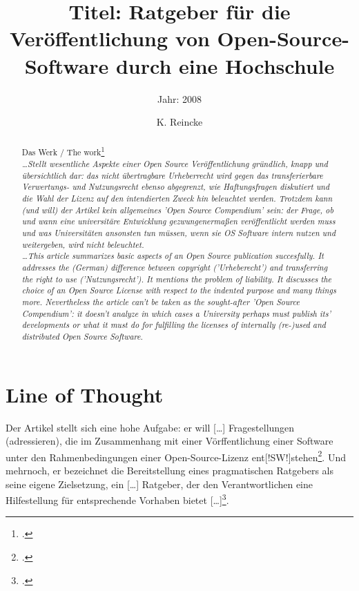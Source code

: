 \documentclass[DIV=calc,BCOR=5mm,11pt,headings=small,oneside,abstract=true, toc=bib]{scrartcl}
\begin{document}

\titlehead{Literaturexzerpt}
\subject{Autor(en): Bretschneider Glaschick Gräfe}
\title{Titel: Ratgeber für die Veröffentlichung von Open-Source-Software durch
eine Hochschule}
\subtitle{Jahr: 2008 }
\author{K. Reincke}

\maketitle

\begin{abstract}
\noindent
Das Werk / The work\footcite[][]{BreGlaGra2008a} \\
\noindent \itshape
\ldots Stellt wesentliche Aspekte einer Open Source Veröffentlichung gründlich,
knapp und übersichtlich dar: das nicht übertragbare Urheberrecht wird gegen das
transferierbare Verwertungs- und Nutzungsrecht ebenso abgegrenzt, wie
Haftungsfragen diskutiert und die Wahl der Lizenz auf den intendierten Zweck hin
beleuchtet werden. Trotzdem kann (und will) der Artikel kein allgemeines 'Open
Source Compendium' sein: der Frage, ob und wann eine universitäre Entwicklung
gezwungenermaßen veröffentlicht werden muss und was Universitäten ansonsten tun
müssen, wenn sie OS Software intern nutzen und weitergeben, wird nicht
beleuchtet.\\
\noindent
\ldots This article summarizes basic aspects of an Open Source publication
succesfully. It addresses the (German) difference between copyright
('Urheberecht') and transferring the right to use ('Nutzungsrecht'). It mentions
the problem of liability. It discusses the choice of an Open Source License with
respect to the indented purpose and many things more. Nevertheless the article
can't be taken as the sought-after 'Open Source Compendium': it doesn't analyze
in which cases a University perhaps must publish its' developments or what it must
do for fulfilling the licenses of internally (re-)used and distributed Open
Source Software.
\end{abstract}
\footnotesize
\normalsize

\section{Line of Thought}

Der Artikel stellt sich eine hohe Aufgabe: er will \glqq{}[\ldots]
Fragestellungen (adressieren), die im Zusammenhang mit einer
Vörffentlichung einer Software unter den Rahmenbedingungen einer
Open-Source-Lizenz ent[!SW!]stehen\grqq{}\footcite[vgl.][167]{BreGlaGra2008a}.
Und mehrnoch, er bezeichnet \glqq{}die Bereitstellung eines pragmatischen
Ratgebers\grqq{} als seine eigene \glqq{}Zielsetzung\grqq{}, ein
\glqq{}[\ldots] Ratgeber, der den Verantwortlichen eine Hilfestellung für
entsprechende Vorhaben bietet
[\ldots]\grqq{}\footcite[vgl.][168]{BreGlaGra2008a}.
\end{document}

